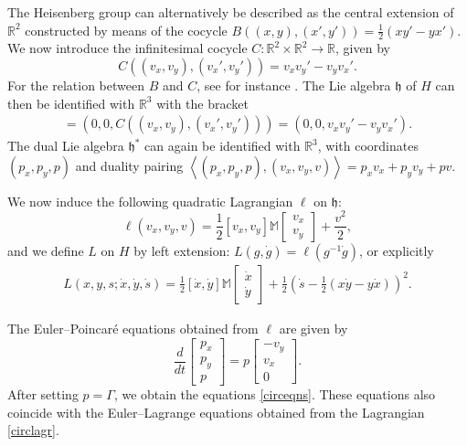 \documentclass[pdftex]{sigma}
\begin{document}
The Heisenberg group can alternatively be described as the central extension of $\mathbb{R}^2$ constructed by means of the cocycle $B((x, y), (x', y')) = \frac{1}{2} (xy' - yx')$.  We now introduce the inf\/initesimal cocycle $C: \mathbb{R}^2 \times \mathbb{R}^2 \to \mathbb{R}$, given by
\[
	C((v_x, v_y), (v_x', v_y')) = v_x v_y' - v_y v_x'.
\]
For the relation between $B$ and $C$, see for instance \cite{MarsdenHamRed}. The Lie algebra $\mathfrak{h}$ of $H$ can then be identif\/ied with $\mathbb{R}^3$ with the bracket
\begin{gather*}
	[(v_x, v_y, v), (v_x', v_y', v')]   = (0, 0, C((v_x, v_y), (v_x', v_y')))
		  = (0, 0, v_x v_y' - v_y v_x').
\end{gather*}
The dual Lie algebra $\mathfrak{h}^\ast$ can again be identif\/ied with $\mathbb{R}^3$, with coordinates $(p_x, p_y, p)$ and duality pairing $\left< (p_x, p_y, p), (v_x, v_y, v) \right> = p_x v_x + p_y v_y + pv$.

We now induce the following quadratic Lagrangian $\ell$ on $\mathfrak{h}$:
\[
	\ell(v_x, v_y, v) = \frac{1}{2} \left[v_x, v_y\right] \mathbb{M} \begin{bmatrix} v_x \\ v_y \end{bmatrix} + \frac{v^2}{2},
\]
and we def\/ine $L$ on $H$ by left extension: $L(g, \dot{g}) = \ell(g^{-1} \dot{g})$, or explicitly
\begin{gather} \label{circlagr}
	L(x, y, s; \dot{x}, \dot{y}, \dot{s}) = \frac{1}{2} \left[\dot{x}, \dot{y} \right] \mathbb{M} \begin{bmatrix} \dot{x} \\ \dot{y} \end{bmatrix}
		+ \frac{1}{2} \left( \dot{s} - \frac{1}{2} (x \dot{y} - y \dot{x}) \right)^2.
\end{gather}

The Euler--Poincar\'e equations obtained from $\ell$ are given by
\[
	\frac{d}{dt} \begin{bmatrix}
		p_x \\ p_y \\ p
	\end{bmatrix} =
		p
	\begin{bmatrix}
		-v_y \\ v_x \\ 0
	\end{bmatrix}.
\]
After setting $p = \Gamma$, we  obtain the equations \eqref{circeqns}.  These equations also coincide with the Euler--Lagrange equations obtained from the Lagrangian \eqref{circlagr}.
\end{document}
